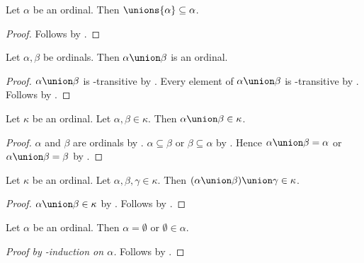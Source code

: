 \begin{lemma}\label{ordinal_subseteq_unions}
    Let $\alpha$ be an ordinal.
    Then $\unions{\alpha}\subseteq \alpha$.
\end{lemma}
\begin{proof}
    Follows by .
\end{proof}

\begin{proposition}\label{union_of_two_ordinals_is_ordinal}
    Let $\alpha,\beta$ be ordinals.
    Then $\alpha\union\beta$ is an ordinal.
\end{proposition}
\begin{proof}
    $\alpha\union\beta$ is \in-transitive by .
    Every element of $\alpha\union\beta$ is \in-transitive
        by .
    Follows by .
\end{proof}

\begin{lemma}\label{ordinal_union_below}
    Let $\kappa$ be an ordinal.
    Let $\alpha,\beta\in\kappa$.
    Then $\alpha\union\beta\in\kappa$.
\end{lemma}
\begin{proof}
    $\alpha$ and $\beta$ are ordinals by
        .
    $\alpha\subseteq\beta$ or $\beta\subseteq\alpha$ by
        .
    Hence $\alpha\union\beta=\alpha$ or
        $\alpha\union\beta=\beta$ by
        .
\end{proof}

\begin{lemma}\label{three_ordinal_union_below}
    Let $\kappa$ be an ordinal.
    Let $\alpha,\beta,\gamma\in\kappa$.
    Then $(\alpha\union\beta)\union\gamma\in\kappa$.
\end{lemma}
\begin{proof}
    $\alpha\union\beta\in\kappa$ by .
    Follows by .
\end{proof}

\begin{proposition}\label{ordinal_empty_or_emptyset_elem}
    Let $\alpha$ be an ordinal.
    Then $\alpha=\emptyset$ or $\emptyset\in\alpha$.
\end{proposition}
\begin{proof}[Proof by \in-induction on $\alpha$]
    Follows by .
\end{proof}

